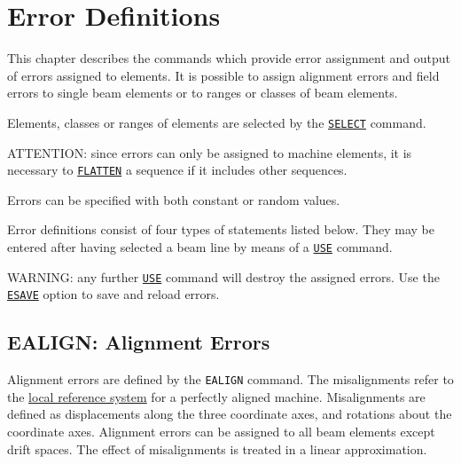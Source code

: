 
\chapter{Error Definitions}
\label{chap:error}
This chapter describes the commands which provide error assignment and
output of errors assigned to elements. It is possible to assign
alignment errors and field errors to single beam elements or to ranges
or classes of beam elements.

Elements, classes or ranges of elements are selected by the
\hyperref[sec:select]{\tt SELECT} command.

ATTENTION: since errors can only be assigned to machine elements, it is
necessary to \hyperref[sec:flatten]{\tt FLATTEN} a sequence
if it includes other sequences.

Errors can be specified with both constant or random values.

Error definitions consist of four types of statements listed below. They
may be entered after having selected a beam line by means of a
\hyperref[sec:use]{\tt USE} command.  

WARNING: any further \hyperref[sec:use]{\tt USE} command
will destroy the assigned errors. Use the
\hyperref[sec:esave]{\tt ESAVE} option to save and reload errors.



%

\section{EALIGN: Alignment Errors} %
\label{sec:ealign}

Alignment errors are defined by the {\tt EALIGN} command. 
The misalignments refer to the
\hyperref[sec:reference]{local reference system} for a
perfectly aligned machine.  
Misalignments are defined as displacements along the three coordinate
axes, and rotations about the coordinate axes. 
Alignment errors can be assigned to all beam elements except drift
spaces. 
The effect of misalignments is treated in a linear
approximation.


